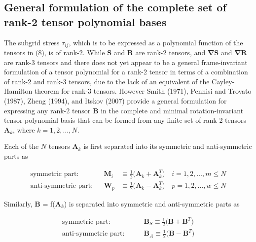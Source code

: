 \subsection{General formulation of the complete set of rank-2 tensor polynomial bases}

The subgrid stress $\tau_{ij}$, which is to be expressed as a polynomial function of the tensors in (8), is of rank-2.  While $\mathbf{S}$ and $\mathbf{R}$ are rank-2 tensors,   and  $\mathbf{\nabla S}$ and $\mathbf{\nabla R}$ are rank-3 tensors and there does not yet appear to be a general frame-invariant formulation of a tensor polynomial for a rank-2 tensor in terms of a combination of rank-2 and rank-3 tensors, due to the lack of an equivalent of the Cayley-Hamilton theorem for rank-3 tensors.  However Smith (1971), Pennisi and Trovato (1987), Zheng (1994), and Itskov (2007) provide a general formulation for expressing any rank-2 tensor $\mathbf{B}$ in the complete and minimal rotation-invariant tensor polynomial basis that can be formed from any finite set of rank-2 tensors $\mathbf{A}_{k}$, where $k=1,2,\ldots,N$.

Each of the $N$ tensors $\mathbf{A}_{k}$ is first separated into its symmetric and anti-symmetric parts as

%
\begin{subequations}
\begin{align}
	\label{E:26}
	\text{symmetric part:} && 
	\mathbf{M}_{i} &\equiv \frac{1}{2} \big( \mathbf{A}_k + \mathbf{A}^T_k \big) \quad
	i = 1,2, \ldots, m \leq N \\
	\text{anti-symmetric part:} && 
	\mathbf{W}_{p} &\equiv \frac{1}{2} \big( \mathbf{A}_k - \mathbf{A}^T_k \big) \quad
	p = 1,2, \ldots, w \leq N 
\end{align}
\end{subequations}
%
%    

	
Similarly, $\mathbf{B}$ = f($\mathbf{A}_{k}$)  is separated into symmetric and anti-symmetric parts as

%
\begin{subequations}
\begin{align}
	\label{E:27}
	\text{symmetric part:} & \qquad
	\mathbf{B}_{S} \equiv \frac{1}{2} \big( \mathbf{B} + \mathbf{B}^T \big) \\
	\text{anti-symmetric part:} & \qquad
	\mathbf{B}_{A} \equiv \frac{1}{2} \big( \mathbf{B} - \mathbf{B}^T \big) 
\end{align}
\end{subequations}
%
%    
	
